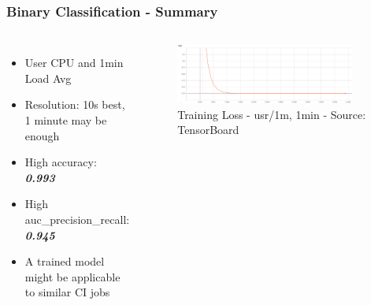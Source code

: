 \documentclass[aspectratio=169,11pt,hyperref={colorlinks=true}]{beamer}
\begin{document}
\begin{frame}
    \frametitle{Binary Classification - Summary}
    \begin{columns}
        \begin{itemize}
            \item{User CPU and 1min Load Avg}
            \item{Resolution: 10s best, 1 minute may be enough}
            \item{High accuracy: \emph{\textbf{0.993}}}
            \item{High auc\_precision\_recall: \emph{\textbf{0.945}}}
            \item{A trained model might be applicable to similar CI jobs}
        \end{itemize}
        \begin{figure}
          \begin{center}
            \includegraphics[width=0.9\textwidth,height=0.5\textheight]{graphs/cpu_1m-1min-status_loss_curve.png}
              \caption{Training Loss - usr/1m, 1min - Source: TensorBoard}
          \end{center}
        \end{figure}
      \end{columns}
\end{frame}
\end{document}
